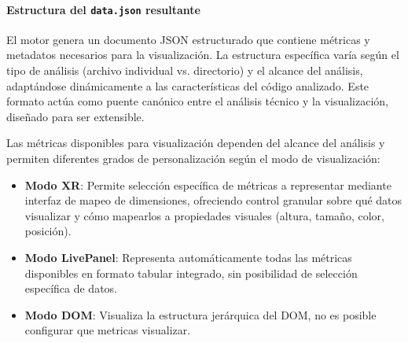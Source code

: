 \documentclass[a4paper, 12pt]{book}
\begin{document}

\paragraph{Estructura del \texttt{data.json} resultante}
El motor genera un documento JSON estructurado que contiene métricas y metadatos necesarios para la visualización. La estructura específica varía según el tipo de análisis (archivo individual vs. directorio) y el alcance del análisis, adaptándose dinámicamente a las características del código analizado. Este formato actúa como puente canónico entre el análisis técnico y la visualización, diseñado para ser extensible.

Las métricas disponibles para visualización dependen del alcance del análisis y permiten diferentes grados de personalización según el modo de visualización:

\begin{itemize}
  \item \textbf{Modo XR}: Permite selección específica de métricas a representar mediante interfaz de mapeo de dimensiones, ofreciendo control granular sobre qué datos visualizar y cómo mapearlos a propiedades visuales (altura, tamaño, color, posición).
  \item \textbf{Modo LivePanel}: Representa automáticamente todas las métricas disponibles en formato tabular integrado, sin posibilidad de selección específica de datos.
  \item \textbf{Modo DOM}: Visualiza la estructura jerárquica del DOM, no es posible configurar que metricas visualizar.
\end{itemize}
\end{document}
